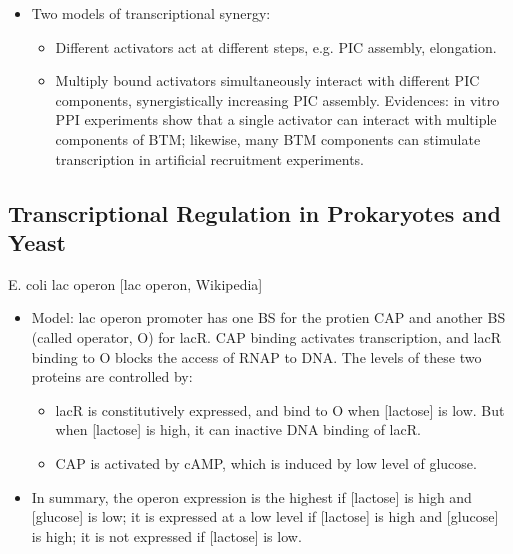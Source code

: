 \documentclass{report}
\begin{document}
\begin{itemize}
	\item Two models of transcriptional synergy: 
	\begin{itemize}
		\item Different activators act at different steps, e.g. PIC assembly, elongation. 
		\item Multiply bound activators simultaneously interact with different PIC components, synergistically increasing PIC assembly. Evidences: in vitro PPI experiments show that a single activator can interact with multiple components of BTM; likewise, many BTM components can stimulate transcription in artificial recruitment experiments. 
	\end{itemize}
\end{itemize}

\subsection{Transcriptional Regulation in Prokaryotes and Yeast}

E. coli lac operon [lac operon, Wikipedia]
\begin{itemize}
	\item Model: lac operon promoter has one BS for the protien CAP and another BS (called operator, O) for lacR. CAP binding activates transcription, and lacR binding to O blocks the access of RNAP to DNA. The levels of these two proteins are controlled by: 
	\begin{itemize}
		\item lacR is constitutively expressed, and bind to O when [lactose] is low. But when [lactose] is high, it can inactive DNA binding of lacR. 
		\item CAP is activated by cAMP, which is induced by low level of glucose. 
	\end{itemize}
	
	\item In summary, the operon expression is the highest if [lactose] is high and [glucose] is low; it is expressed at a low level if [lactose] is high and [glucose] is high; it is not expressed if [lactose] is low.
\end{itemize}
\end{document}
